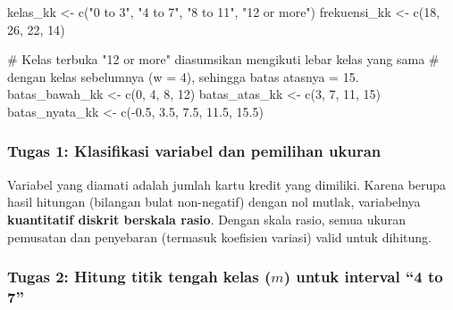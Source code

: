 \documentclass[
  indonesian,
  letterpaper,
]{book}
\newenvironment{Shaded}{\begin{snugshade}}{\end{snugshade}}
\newcommand{\CommentTok}[1]{\textcolor[rgb]{0.37,0.37,0.37}{#1}}
\newcommand{\DecValTok}[1]{\textcolor[rgb]{0.68,0.00,0.00}{#1}}
\newcommand{\FloatTok}[1]{\textcolor[rgb]{0.68,0.00,0.00}{#1}}
\newcommand{\FunctionTok}[1]{\textcolor[rgb]{0.28,0.35,0.67}{#1}}
\newcommand{\NormalTok}[1]{\textcolor[rgb]{0.00,0.23,0.31}{#1}}
\newcommand{\OtherTok}[1]{\textcolor[rgb]{0.00,0.23,0.31}{#1}}
\newcommand{\SpecialCharTok}[1]{\textcolor[rgb]{0.37,0.37,0.37}{#1}}
\newcommand{\StringTok}[1]{\textcolor[rgb]{0.13,0.47,0.30}{#1}}
\begin{document}
\begin{Shaded}
\begin{Highlighting}[]
\NormalTok{kelas\_kk }\OtherTok{\textless{}{-}} \FunctionTok{c}\NormalTok{(}\StringTok{"0 to 3"}\NormalTok{, }\StringTok{"4 to 7"}\NormalTok{, }\StringTok{"8 to 11"}\NormalTok{, }\StringTok{"12 or more"}\NormalTok{)}
\NormalTok{frekuensi\_kk }\OtherTok{\textless{}{-}} \FunctionTok{c}\NormalTok{(}\DecValTok{18}\NormalTok{, }\DecValTok{26}\NormalTok{, }\DecValTok{22}\NormalTok{, }\DecValTok{14}\NormalTok{)}

\CommentTok{\# Kelas terbuka "12 or more" diasumsikan mengikuti lebar kelas yang sama}
\CommentTok{\# dengan kelas sebelumnya (w = 4), sehingga batas atasnya = 15.}
\NormalTok{batas\_bawah\_kk }\OtherTok{\textless{}{-}} \FunctionTok{c}\NormalTok{(}\DecValTok{0}\NormalTok{, }\DecValTok{4}\NormalTok{, }\DecValTok{8}\NormalTok{, }\DecValTok{12}\NormalTok{)}
\NormalTok{batas\_atas\_kk  }\OtherTok{\textless{}{-}} \FunctionTok{c}\NormalTok{(}\DecValTok{3}\NormalTok{, }\DecValTok{7}\NormalTok{, }\DecValTok{11}\NormalTok{, }\DecValTok{15}\NormalTok{)}
\NormalTok{batas\_nyata\_kk }\OtherTok{\textless{}{-}} \FunctionTok{c}\NormalTok{(}\SpecialCharTok{{-}}\FloatTok{0.5}\NormalTok{, }\FloatTok{3.5}\NormalTok{, }\FloatTok{7.5}\NormalTok{, }\FloatTok{11.5}\NormalTok{, }\FloatTok{15.5}\NormalTok{)}
\end{Highlighting}
\end{Shaded}

\subsubsection{Tugas 1: Klasifikasi variabel dan pemilihan
ukuran}\label{tugas-1-klasifikasi-variabel-dan-pemilihan-ukuran}

Variabel yang diamati adalah jumlah kartu kredit yang dimiliki. Karena
berupa hasil hitungan (bilangan bulat non-negatif) dengan nol mutlak,
variabelnya \textbf{kuantitatif diskrit berskala rasio}. Dengan skala
rasio, semua ukuran pemusatan dan penyebaran (termasuk koefisien
variasi) valid untuk dihitung.

\subsubsection{\texorpdfstring{Tugas 2: Hitung titik tengah kelas
(\(m\)) untuk interval ``4 to
7''}{Tugas 2: Hitung titik tengah kelas (m) untuk interval ``4 to 7''}}\label{tugas-2-hitung-titik-tengah-kelas-m-untuk-interval-4-to-7}
\end{document}
